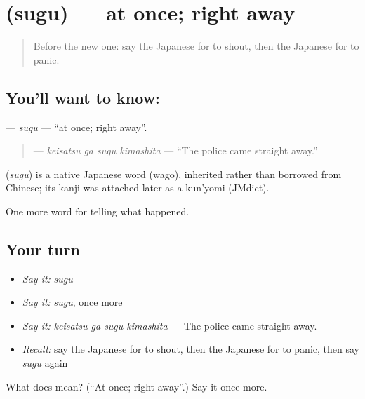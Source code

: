 \section[\texorpdfstring{\ja{すぐ} (sugu)}{すぐ (sugu)}]{ (sugu) — at once; right away}

\label{lesson:JA-C263-sugu}



\begin{quote}
Before the new one: say the Japanese for to shout, then the Japanese for to panic.
\end{quote}

\subsection*{You'll want to know: }
\textbf{} — \emph{sugu} — \textquotedblleft{}at once; right away\textquotedblright{}.

\begin{quote}
\textbf{  } — \emph{keisatsu ga sugu kimashita} — \textquotedblleft{}The police came straight away.\textquotedblright{}
\end{quote}

\begin{cousinweb}
\textbf{} (\emph{sugu}) is a native Japanese word (wago), inherited rather than borrowed from Chinese; its kanji was attached later as a kun'yomi (JMdict).
\end{cousinweb}

\begin{grammarlens}[title={What you've built}]
One more word for telling what happened.
\end{grammarlens}

\subsection*{Your turn}
\begin{itemize}
\raggedright
  \item \emph{Say it:} \emph{sugu}
  \item \emph{Say it:} \emph{sugu}, once more
  \item \emph{Say it:} \emph{keisatsu ga sugu kimashita} — The police came straight away.
  \item \emph{Recall:} say the Japanese for to shout, then the Japanese for to panic, then say \emph{sugu} again
\end{itemize}

\begin{tcolorbox}[breakable,colback=teal!4,colframe=teal!35!black,title={Before you move on}]
What does  mean? (\textquotedblleft{}At once; right away\textquotedblright{}.) Say it once more.
\end{tcolorbox}
